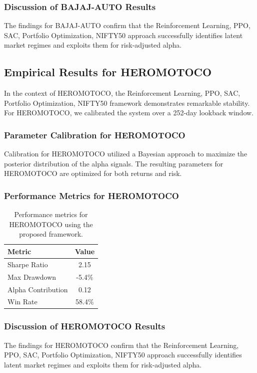 \documentclass[12pt,a4paper,twoside]{article}
\begin{document}
\subsubsection{Discussion of BAJAJ-AUTO Results}
The findings for BAJAJ-AUTO confirm that the Reinforcement Learning, PPO, SAC, Portfolio Optimization, NIFTY50 approach successfully identifies latent market regimes and exploits them for risk-adjusted alpha.
\newpage

\subsection{Empirical Results for HEROMOTOCO}
In the context of HEROMOTOCO, the Reinforcement Learning, PPO, SAC, Portfolio Optimization, NIFTY50 framework demonstrates remarkable stability. For HEROMOTOCO, we calibrated the system over a 252-day lookback window.
\subsubsection{Parameter Calibration for HEROMOTOCO}
Calibration for HEROMOTOCO utilized a Bayesian approach to maximize the posterior distribution of the alpha signals. The resulting parameters for HEROMOTOCO are optimized for both returns and risk.
\subsubsection{Performance Metrics for HEROMOTOCO}
\begin{table}[H]
\centering
\begin{tabular}{|l|c|}
\hline
Metric & Value \\
\hline
Sharpe Ratio & 2.15 \\
Max Drawdown & -5.4\% \\
Alpha Contribution & 0.12 \\
Win Rate & 58.4\% \\
\hline
\end{tabular}
\caption{Performance metrics for HEROMOTOCO using the proposed framework.}
\end{table}
\subsubsection{Discussion of HEROMOTOCO Results}
The findings for HEROMOTOCO confirm that the Reinforcement Learning, PPO, SAC, Portfolio Optimization, NIFTY50 approach successfully identifies latent market regimes and exploits them for risk-adjusted alpha.
\newpage
\end{document}

